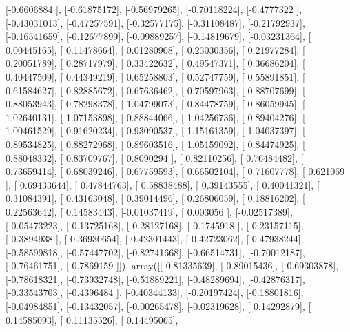 \documentclass{article}
\begin{document}
       [-0.6606884 ],
       [-0.61875172],
       [-0.56979265],
       [-0.70118224],
       [-0.4777322 ],
       [-0.43031013],
       [-0.47257591],
       [-0.32577175],
       [-0.31108487],
       [-0.21792937],
       [-0.16541659],
       [-0.12677899],
       [-0.09889257],
       [-0.14819679],
       [-0.03231364],
       [ 0.00445165],
       [ 0.11478664],
       [ 0.01280908],
       [ 0.23030356],
       [ 0.21977284],
       [ 0.20051789],
       [ 0.28717979],
       [ 0.33422632],
       [ 0.49547371],
       [ 0.36686204],
       [ 0.40447509],
       [ 0.44349219],
       [ 0.65258803],
       [ 0.52747759],
       [ 0.55891851],
       [ 0.61584627],
       [ 0.82885672],
       [ 0.67636462],
       [ 0.70597963],
       [ 0.88707699],
       [ 0.88053943],
       [ 0.78298378],
       [ 1.04799073],
       [ 0.84478759],
       [ 0.86059945],
       [ 1.02640131],
       [ 1.07153898],
       [ 0.88844066],
       [ 1.04256736],
       [ 0.89404276],
       [ 1.00461529],
       [ 0.91620234],
       [ 0.93090537],
       [ 1.15161359],
       [ 1.04037397],
       [ 0.89534825],
       [ 0.88272968],
       [ 0.89603516],
       [ 1.05159092],
       [ 0.84474925],
       [ 0.88048332],
       [ 0.83709767],
       [ 0.8090294 ],
       [ 0.82110256],
       [ 0.76484482],
       [ 0.73659414],
       [ 0.68039246],
       [ 0.67759593],
       [ 0.66502104],
       [ 0.71607778],
       [ 0.621069  ],
       [ 0.69433644],
       [ 0.47844763],
       [ 0.58838488],
       [ 0.39143555],
       [ 0.40041321],
       [ 0.31084391],
       [ 0.43163048],
       [ 0.39014496],
       [ 0.26806059],
       [ 0.18816202],
       [ 0.22563642],
       [ 0.14583443],
       [-0.01037419],
       [ 0.003056  ],
       [-0.02517389],
       [-0.05473223],
       [-0.13725168],
       [-0.28127168],
       [-0.1745918 ],
       [-0.23157115],
       [-0.3894938 ],
       [-0.36930654],
       [-0.42301443],
       [-0.42723062],
       [-0.47938244],
       [-0.58599818],
       [-0.57447702],
       [-0.82741668],
       [-0.66514731],
       [-0.70012187],
       [-0.76461751],
       [-0.7869159 ]]), array([[-0.81335639],
       [-0.89015436],
       [-0.69303878],
       [-0.78618321],
       [-0.73932748],
       [-0.51889221],
       [-0.48289694],
       [-0.42876317],
       [-0.33543703],
       [-0.4396484 ],
       [-0.40344133],
       [-0.20197424],
       [-0.18801816],
       [-0.04984851],
       [-0.13432057],
       [-0.00265478],
       [-0.02319628],
       [ 0.14292879],
       [ 0.14585093],
       [ 0.11135526],
       [ 0.14495065],
\end{document}
